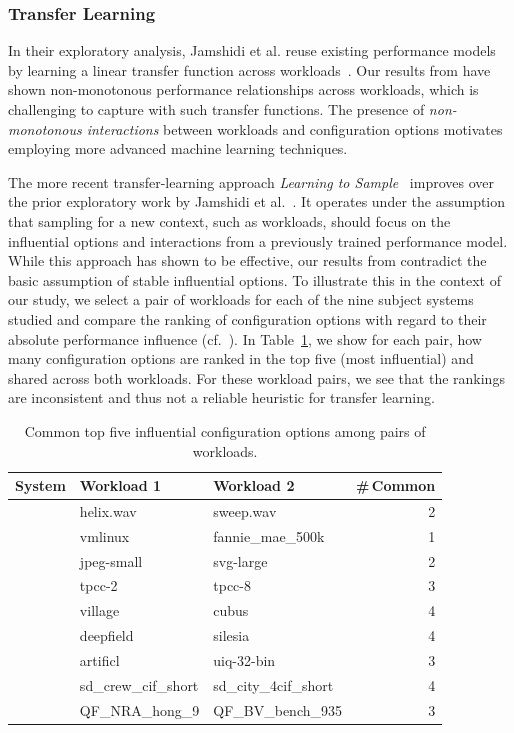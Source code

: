 {{{\subsubsection{Transfer Learning} In their exploratory analysis, Jamshidi et al. reuse existing performance models by learning a linear transfer function across workloads~\cite{jamishidi_transfer_2017}. Our results from  have shown non-monotonous performance relationships across workloads, which is challenging to capture with such transfer functions. The presence of \textit{non-monotonous interactions} between workloads and configuration options motivates employing more advanced machine learning techniques. 

The more recent transfer-learning approach \emph{Learning to Sample}~\cite{jamshidi_learning_2018} improves over the prior exploratory work by Jamshidi et al.~\cite{jamishidi_transfer_2017}. It operates under the assumption that sampling for a new context, such as workloads, should focus on the influential options and interactions from a previously trained performance model. While this approach has shown to be effective, our results from  contradict the basic assumption of stable influential options. 
To illustrate this in the context of our study, we select a pair of workloads for each of the nine subject systems studied and compare the ranking of configuration options with regard to their absolute performance influence (cf.~). In Table~\ref{tab:shared_options}, we show for each pair, how many configuration options are ranked in the top five (most influential) and shared across both workloads. For these workload pairs, we see that the rankings are inconsistent and thus not a reliable heuristic for transfer learning.
\begin{table}
	\centering
	\footnotesize
	\caption{Common top five influential configuration options among pairs of workloads.}
	\begin{tabular}{p{12mm}llr}
		\toprule
		\textbf{System} & \textbf{Workload 1} & \textbf{Workload 2} & \textbf{\#\,Common} \\
		\midrule
		\jumper & helix.wav & sweep.wav & 2\\
		\kanzi & vmlinux & fannie\_mae\_500k & 1\\
		\dconvert & jpeg-small & svg-large & 2\\
		\htwo & tpcc-2 & tpcc-8 & 3\\
		\batik & village & cubus & 4\\
		\midrule
		\xz & deepfield & silesia & 4\\
		\lrzip & artificl & uiq-32-bin & 3\\
		\xzwo & sd\_crew\_cif\_short &sd\_city\_4cif\_short & 4\\
		\zdrei & QF\_NRA\_hong\_9 & QF\_BV\_bench\_935 & 3\\
		\bottomrule
	\end{tabular}
\label{tab:shared_options}
\end{table}


}}}
